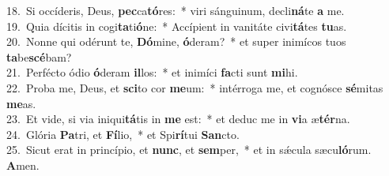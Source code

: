 {18.~}Si occíderis, Deus, \textbf{pec}ca\textbf{tó}res:~* viri sánguinum, decli\textbf{ná}te \textbf{a} me.\\
{19.~}Quia dícitis in cogi\textbf{ta}ti\textbf{ó}ne:~* Accípient in vanitáte civi\textbf{tá}tes \textbf{tu}as.\\
{20.~}Nonne qui odérunt te, \textbf{Dó}mine, \textbf{ó}deram?~* et super inimícos tuos \textbf{ta}be\textbf{scé}bam?\\
{21.~}Perfécto ódio \textbf{ó}deram \textbf{il}los:~* et inimíci \textbf{fa}cti sunt \textbf{mi}hi.\\
{22.~}Proba me, Deus, et \textbf{sci}to cor \textbf{me}um:~* intérroga me, et cognósce \textbf{sé}mitas \textbf{me}as.\\
{23.~}Et vide, si via iniqui\textbf{tá}tis in \textbf{me} est:~* et deduc me in \textbf{vi}a æ\textbf{tér}na.\\
{24.~}Glória \textbf{Pa}tri, et \textbf{Fí}lio,~* et Spi\textbf{rí}tui \textbf{San}cto.\\
{25.~}Sicut erat in princípio, et \textbf{nunc}, et \textbf{sem}per,~* et in sǽcula sæcu\textbf{ló}rum. \textbf{A}men.\\
